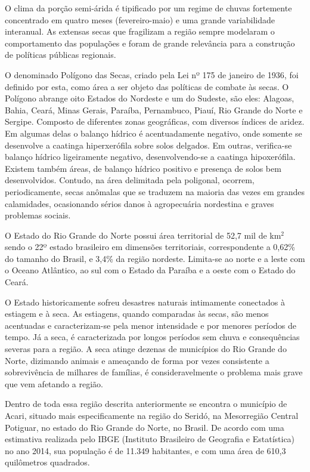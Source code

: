 O clima da porção semi-árida é tipificado por um regime de chuvas fortemente concentrado em quatro meses (fevereiro-maio) e
uma grande variabilidade interanual. As extensas secas que fragilizam a região sempre modelaram o comportamento das populações
e foram de grande relevância para a construção de políticas públicas regionais.

O denominado Polígono das Secas, criado pela Lei nº 175 de janeiro de 1936, foi definido por esta, como área a ser objeto das
políticas de combate às secas. O Polígono
abrange oito Estados do Nordeste e um do Sudeste, são eles: Alagoas, Bahia, Ceará, Minas Gerais, Paraíba, Pernambuco, Piauí, Rio Grande do Norte e Sergipe. Composto de diferentes zonas geográficas, com diversos índices de aridez.
Em algumas delas o balanço hídrico é acentuadamente negativo, onde somente se desenvolve a caatinga hiperxerófila sobre solos
delgados. Em outras, verifica-se balanço hídrico ligeiramente negativo, desenvolvendo-se a caatinga hipoxerófila. 
Existem também áreas, de balanço hídrico positivo e presença de solos bem desenvolvidos. Contudo, na área delimitada pela 
poligonal, ocorrem, periodicamente, secas anômalas que se traduzem na maioria das vezes em grandes calamidades, ocasionando 
sérios danos à agropecuária nordestina e graves problemas sociais.

O Estado do Rio Grande do Norte possui área territorial de 52,7 mil de km$^2$ sendo o 22º estado brasileiro em dimensões 
territoriais, correspondente a 0,62\% do tamanho do Brasil, e 3,4\% da região nordeste. 
Limita-se ao norte e a leste com o Oceano Atlântico, ao sul com o Estado da Paraíba e a oeste com o Estado do Ceará.

O Estado historicamente sofreu desastres naturais intimamente conectados à estiagem e à seca. 
As estiagens, quando comparadas às secas, são menos acentuadas e caracterizam-se pela menor intensidade e por menores
períodos de tempo. Já a seca, é caracterizada por longos períodos sem chuva e consequências severas para a região. 
A seca atinge dezenas de municípios do Rio Grande do Norte, dizimando animais e ameaçando de forma por vezes consistente 
a sobrevivência de milhares de famílias, é consideravelmente o problema mais grave que vem afetando a região.

Dentro de toda essa região descrita anteriormente se encontra o município de Acari, situado mais especificamente na 
região do Seridó, na Mesorregião Central Potiguar, no estado do Rio Grande do Norte, no Brasil. De acordo com uma estimativa
realizada pelo IBGE (Instituto Brasileiro de Geografia e Estatística) no ano 2014, sua população é de 11.349 habitantes, e
com uma área de 610,3 quilômetros quadrados.

